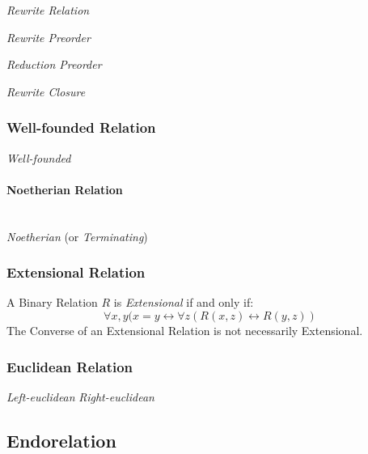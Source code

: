 \emph{Rewrite Relation}

\emph{Rewrite Preorder}

\emph{Reduction Preorder}

\emph{Rewrite Closure}



\subsubsection{Well-founded Relation}\label{sec:well_founded}

\emph{Well-founded}



\paragraph{Noetherian Relation}\label{sec:noetherian_relation}
\hfill \\

\emph{Noetherian} (or \emph{Terminating})



\subsubsection{Extensional Relation}\label{sec:extensional_relation}

A Binary Relation $R$ is \emph{Extensional} if and only if:
\[
  \forall x,y (x = y \leftrightarrow
    \forall z (R(x,z) \leftrightarrow R(y,z))
\]
The Converse of an Extensional Relation is not necessarily
Extensional.

\subsubsection{Euclidean Relation}\label{sec:euclidean_relation}

\emph{Left-euclidean} \emph{Right-euclidean}



\subsection{Endorelation}\label{sec:endorelation}

